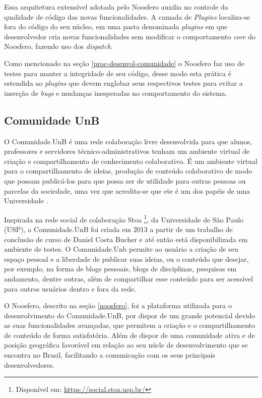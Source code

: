 Essa arquitetura extensível adotada pelo Noosfero auxilia no controle da qualidade de código das novas funcionalidades. A camada de \textit{Plugins} localiza-se fora do código do seu núcleo, em uma pasta denominada \textit{plugins} em que desenvolvedor cria novas funcionalidades sem modificar o comportamento \textit{core} do Noosfero, fazendo uso dos \textit{dispatch}.

Como mencionado na seção \ref{proc-desenvol-comunidade} o Noosfero faz uso de testes para manter a integridade de seu código, desse modo esta prática é estendida ao \textit{plugins} que devem englobar seus respectivos testes para evitar a inserção de \textit{bugs} e mudanças inesperadas no comportamento do sistema.

\subsection{Comunidade UnB}
\label{comunidade-unb}

O Comunidade.UnB é uma rede colaboração livre desenvolvida para que alunos, professores e servidores técnico-administrativos tenham um ambiente virtual de criação e compartilhamento de conhecimento colaborativo. É um ambiente virtual para o compartilhamento de ideias, produção de conteúdo colaborativo de modo que possam publicá-los para que possa ser de utilidade para outras pessoas ou parcelas da sociedade, uma vez que acredita-se que ete é um dos papéis de uma Universidade \cite{bucher2013rede}.

Inspirada na rede social de colaboração Stoa \footnote{Disponível em: \url{https://social.stoa.usp.br/}}, da Universidade de São Paulo (USP), a Comunidade.UnB foi criada em 2013 a partir de um trabalho de conclusão de curso de Daniel Costa Bucher e até então está disponibilizada em ambiente de testes. O Comunidade.Unb permite ao usuário a criação de seu espaço pessoal e a liberdade de publicar suas ideias, ou o conteúdo que desejar, por exemplo, na forma de blogs pessoais, blogs de disciplinas, pesquisas em andamento, dentre outras, além de compartilhar esse conteúdo para ser acessível para outros usuários dentro e fora da rede.

O Noosfero, descrito na seção \ref{noosfero}, foi a plataforma utilizada para o desenvolvimento do Comunidade.UnB, por dispor de um grande potencial devido as suas funcionalidades avançadas, que permitem a criação e o compartilhamento de conteúdo de forma satisfatória. Além de dispor de uma comunidade ativa e de posição geográfica favorável em relação ao seu núcle de desenvolvimento que se encontra no Brasil, facilitando a comunicação com os seus principais desenvolvedores.

